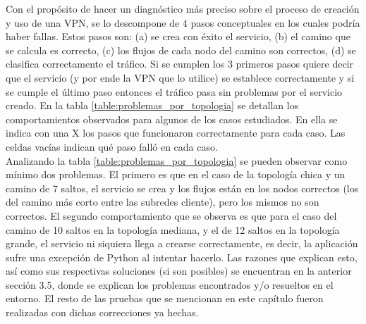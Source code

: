 Con el propósito de hacer un diagnóstico más preciso sobre el proceso de creación y uso de una VPN, se lo descompone de 4 pasos conceptuales en los cuales podría haber fallas. Estos pasos son: (a) se crea con éxito el servicio, (b) el camino que se calcula es correcto, (c) los flujos de cada nodo del camino son correctos, (d) se clasifica correctamente el tráfico. Si se cumplen los 3 primeros pasos quiere decir que el servicio (y por ende la VPN que lo utilice) se establece correctamente y si se cumple el último paso entonces el tráfico pasa sin problemas por el servicio creado. En la tabla \ref{table:problemas_por_topologia} se detallan los comportamientos observados para algunos de los casos estudiados. En ella se indica con una X los pasos que funcionaron correctamente para cada caso. Las celdas vacías indican qué paso falló en cada caso. \\

Analizando la tabla \ref{table:problemas_por_topologia} se pueden observar como mínimo dos problemas. El primero es que en el caso de la topología chica y un camino de 7 saltos, el servicio se crea y los flujos están en los nodos correctos (los del camino más corto entre las subredes cliente), pero los mismos no son correctos. El segundo comportamiento que se observa es que para el caso del camino de 10 saltos en la topología mediana, y el de 12 saltos en la topología grande, el servicio ni siquiera llega a crearse correctamente, es decir, la aplicación sufre una excepción de Python al intentar hacerlo. Las razones que explican esto, así como sus respectivas soluciones (si son posibles) se encuentran en la anterior sección 3.5, donde se explican los problemas encontrados y/o resueltos en el entorno. El resto de las pruebas que se mencionan en este capítulo fueron realizadas con dichas correcciones ya hechas.\\ \\

